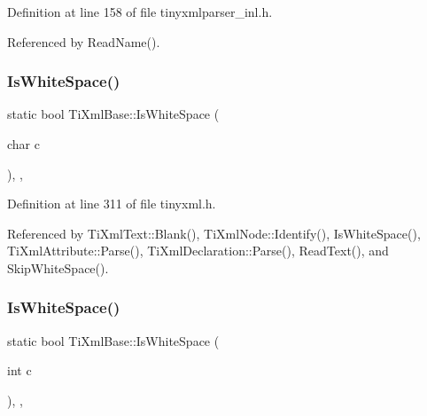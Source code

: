 Definition at line 158 of file tinyxmlparser\+\_\+inl.\+h.



Referenced by Read\+Name().

\hypertarget{class_ti_xml_base_af56296d561c0bab4bc8e198cdcf5c48e}{}\label{class_ti_xml_base_af56296d561c0bab4bc8e198cdcf5c48e} 
\subsubsection{\texorpdfstring{Is\+White\+Space()}{IsWhiteSpace()}\hspace{0.1cm}{\footnotesize\ttfamily [1/2]}}
{\footnotesize\ttfamily static bool Ti\+Xml\+Base\+::\+Is\+White\+Space (\begin{DoxyParamCaption}\item[{char}]{c }\end{DoxyParamCaption})\hspace{0.3cm}{\ttfamily [inline]}, {\ttfamily [static]}, {\ttfamily [protected]}}



Definition at line 311 of file tinyxml.\+h.



Referenced by Ti\+Xml\+Text\+::\+Blank(), Ti\+Xml\+Node\+::\+Identify(), Is\+White\+Space(), Ti\+Xml\+Attribute\+::\+Parse(), Ti\+Xml\+Declaration\+::\+Parse(), Read\+Text(), and Skip\+White\+Space().

\hypertarget{class_ti_xml_base_a3de391ea9f4c4a8aa10d04480b048795}{}\label{class_ti_xml_base_a3de391ea9f4c4a8aa10d04480b048795} 
\subsubsection{\texorpdfstring{Is\+White\+Space()}{IsWhiteSpace()}\hspace{0.1cm}{\footnotesize\ttfamily [2/2]}}
{\footnotesize\ttfamily static bool Ti\+Xml\+Base\+::\+Is\+White\+Space (\begin{DoxyParamCaption}\item[{int}]{c }\end{DoxyParamCaption})\hspace{0.3cm}{\ttfamily [inline]}, {\ttfamily [static]}, {\ttfamily [protected]}}



